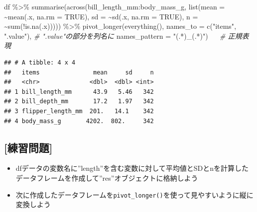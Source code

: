 \documentclass[
  xelatex,ja=standard, b5paper]{bxjsbook}
\newenvironment{Shaded}{\begin{snugshade}}{\end{snugshade}}
\newcommand{\AttributeTok}[1]{\textcolor[rgb]{0.77,0.63,0.00}{#1}}
\newcommand{\CommentTok}[1]{\textcolor[rgb]{0.56,0.35,0.01}{\textit{#1}}}
\newcommand{\ConstantTok}[1]{\textcolor[rgb]{0.00,0.00,0.00}{#1}}
\newcommand{\FunctionTok}[1]{\textcolor[rgb]{0.00,0.00,0.00}{#1}}
\newcommand{\NormalTok}[1]{#1}
\newcommand{\SpecialCharTok}[1]{\textcolor[rgb]{0.00,0.00,0.00}{#1}}
\newcommand{\StringTok}[1]{\textcolor[rgb]{0.31,0.60,0.02}{#1}}
\providecommand{\tightlist}{%
  \setlength{\itemsep}{0pt}\setlength{\parskip}{0pt}}
\begin{document}
\begin{Shaded}
\begin{Highlighting}[]
\NormalTok{df }\SpecialCharTok{\%\textgreater{}\%} 
  \FunctionTok{summarise}\NormalTok{(}\FunctionTok{across}\NormalTok{(bill\_length\_mm}\SpecialCharTok{:}\NormalTok{body\_mass\_g,}
                   \FunctionTok{list}\NormalTok{(}\AttributeTok{mean =} \SpecialCharTok{\textasciitilde{}}\FunctionTok{mean}\NormalTok{(.x, }\AttributeTok{na.rm =} \ConstantTok{TRUE}\NormalTok{),}
                        \AttributeTok{sd =} \SpecialCharTok{\textasciitilde{}}\FunctionTok{sd}\NormalTok{(.x, }\AttributeTok{na.rm =} \ConstantTok{TRUE}\NormalTok{),}
                        \AttributeTok{n =} \SpecialCharTok{\textasciitilde{}}\FunctionTok{sum}\NormalTok{(}\SpecialCharTok{!}\FunctionTok{is.na}\NormalTok{(.x))))) }\SpecialCharTok{\%\textgreater{}\%} 
  \FunctionTok{pivot\_longer}\NormalTok{(}\FunctionTok{everything}\NormalTok{(),}
               \AttributeTok{names\_to =} \FunctionTok{c}\NormalTok{(}\StringTok{"items"}\NormalTok{, }\StringTok{".value"}\NormalTok{), }\CommentTok{\# ".value"の部分を列名に}
               \AttributeTok{names\_pattern =} \StringTok{"(.*)\_(.*)"}\NormalTok{) 　  }\CommentTok{\# 正規表現}
\end{Highlighting}
\end{Shaded}

\begin{verbatim}
## # A tibble: 4 x 4
##   items               mean     sd     n
##   <chr>              <dbl>  <dbl> <int>
## 1 bill_length_mm      43.9   5.46   342
## 2 bill_depth_mm       17.2   1.97   342
## 3 flipper_length_mm  201.   14.1    342
## 4 body_mass_g       4202.  802.     342
\end{verbatim}

\hypertarget{ux7df4ux7fd2ux554fux984c-15}{%
\subsection{{[}練習問題{]}}\label{ux7df4ux7fd2ux554fux984c-15}}

\begin{itemize}
\tightlist
\item
  dfデータの変数名に''length''を含む変数に対して平均値とSDとnを計算したデータフレームを作成して''res''オブジェクトに格納しよう
\item
  次に作成したデータフレームを\texttt{pivot\_longer()}を使って見やすいように縦に変換しよう
\end{itemize}
\end{document}
